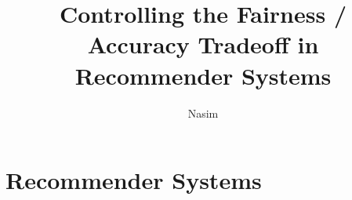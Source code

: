 \documentclass[defaultstyle,11pt,inlineh4]{thesis}
\title{Controlling the Fairness / Accuracy Tradeoff in Recommender Systems}
\author{Nasim}{Sonboli}
\begin{document}


% 
% 

\chapter{Recommender Systems}
\label{ch:recsys}

% 

% 
% 
% 

\nocite{*}		%

% 
% 
\end{document}
